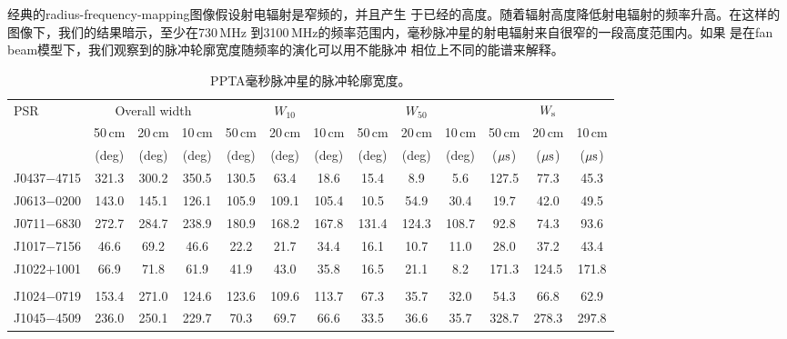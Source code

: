 经典的radius-frequency-mapping图像\supercite{Cordes78}假设射电辐射是窄频的，并且产生
于已经的高度。随着辐射高度降低射电辐射的频率升高。在这样的图像下，我们的结果暗示，至少在730\,MHz
到3100\,MHz的频率范围内，毫秒脉冲星的射电辐射来自很窄的一段高度范围内。如果
是在fan beam模型下\supercite{Wang14}，我们观察到的脉冲轮廓宽度随频率的演化可以用不能脉冲
相位上不同的能谱来解释。

\begin{landscape}
\begin{table}
\begin{center}
\caption{PPTA毫秒脉冲星的脉冲轮廓宽度。}
\label{tableWidth}
\begin{tabular}{lcccccccccccc}
\hline
PSR              & \multicolumn{3}{c}{Overall width} &        & $W_{10}$&        &       &  $W_{50}$ &      &       &  $W_{\rm{s}}$&       \\
								 &  50\,cm & 20\,cm & 10\,cm         & 50\,cm & 20\,cm  & 10\,cm & 50\,cm& 20\,cm    &10\,cm&50\,cm &  20\,cm      &10\,cm \\
								 &  (deg) &  (deg) & (deg)           & (deg)  & (deg)   & (deg)  & (deg) &   (deg)   & (deg)& ($\rm{\mu s}$) & ($\rm{\mu s}$) & ($\rm{\mu s}$)  \\
\hline
J0437$-$4715     & 321.3 &  300.2 &  350.5  &   130.5     & 63.4   & 18.6   & 15.4  & 8.9   & 5.6     &  127.5  &  77.3   & 45.3    \\
J0613$-$0200     & 143.0 &  145.1 &  126.1  &   105.9     & 109.1  & 105.4  & 10.5  & 54.9  & 30.4    &  19.7   &  42.0   & 49.5    \\
J0711$-$6830     & 272.7 &  284.7 &  238.9  &   180.9     & 168.2  & 167.8  & 131.4 & 124.3 & 108.7   &  92.8   &  74.3   & 93.6    \\
J1017$-$7156     & 46.6  &  69.2  &  46.6   &   22.2      & 21.7   & 34.4   & 16.1  & 10.7  & 11.0    &  28.0   &  37.2   & 43.4    \\
J1022$+$1001     & 66.9  &  71.8  &  61.9   &   41.9      & 43.0   & 35.8   & 16.5  & 21.1  & 8.2     &  171.3  &  124.5  & 171.8   \\
	               &       &        &         &             &        &        &       &       &         &         &         &         \\     
J1024$-$0719     & 153.4 &  271.0 &  124.6  &   123.6     & 109.6  & 113.7  & 67.3  & 35.7  & 32.0    &  54.3   &  66.8   & 62.9    \\
J1045$-$4509     & 236.0 &  250.1 &  229.7  &   70.3      & 69.7   & 66.6   & 33.5  & 36.6  & 35.7    &  328.7  &  278.3  & 297.8   \\

\end{tabular}
\end{center}
\end{table}
\end{landscape}

